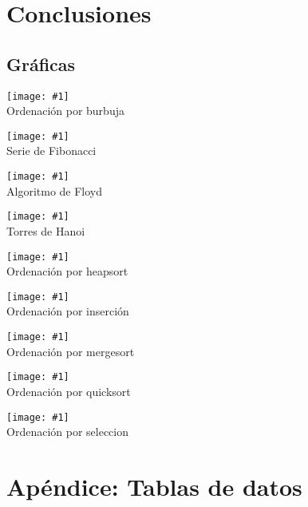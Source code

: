 \documentclass[a4paper, 11pt]{article} %
\newcommand{\imagen}[2]{\begin{figure*}[ht!] \centering \texttt{[image: \#1]} \\ #2 \end{figure*}}
\begin{document}
\section {Conclusiones}
\subsection {Gráficas}
\imagen{../regressionPlots/burbuja_fit.jpg}{Ordenación por burbuja}

\imagen{../regressionPlots/fibonacci_fit.jpg}{Serie de Fibonacci}

\imagen{../regressionPlots/floyd_fit.jpg}{Algoritmo de Floyd}

\imagen{../regressionPlots/hanoi_fit.jpg}{Torres de Hanoi}

\imagen{../regressionPlots/heapsort_fit.jpg}{Ordenación por heapsort}

\imagen{../regressionPlots/insercion_fit.jpg}{Ordenación por inserción}

\imagen{../regressionPlots/mergesort_fit.jpg}{Ordenación por mergesort}

\imagen{../regressionPlots/quicksort_fit.jpg}{Ordenación por quicksort}

\imagen{../regressionPlots/seleccion_fit.jpg}{Ordenación por seleccion}

\newpage
\section{Apéndice: Tablas de datos}









\end{document}
